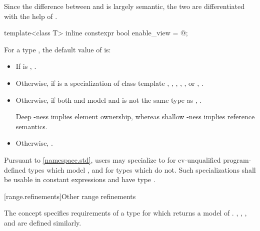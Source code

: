 \pnum
Since the difference between  and  is largely
semantic, the two are differentiated with the help of .

%
\begin{itemdecl}
template<class T>
  inline constexpr bool enable_view = @\seebelow@;
\end{itemdecl}

\begin{itemdescr}
\pnum
\remarks
For a type , the default value of  is:
\begin{itemize}

\item If  is , .
\item Otherwise, if  is a specialization of class template
  ,
  ,
  ,
  ,
  , or
  , .
\item Otherwise, if both  and  model 
  and  is not the same type as
  ,
  .
  \begin{note}
  Deep -ness implies element ownership,
  whereas shallow -ness implies reference semantics.
  \end{note}
\item Otherwise, .
\end{itemize}

\pnum
Pursuant to \ref{namespace.std}, users may specialize 
to 
for cv-unqualified program-defined types which model ,
and  for types which do not.
Such specializations shall
be usable in constant expressions and
have type .
\end{itemdescr}

[range.refinements]{Other range refinements}

\pnum
The  concept specifies requirements of a
 type for which  returns
a model of .
, , ,
and  are defined similarly.

